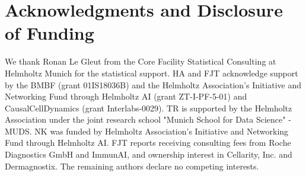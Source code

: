 \documentclass{article}
\begin{document}
\section*{Acknowledgments and Disclosure of Funding}
We thank Ronan Le Gleut from the Core Facility Statistical Consulting at Helmholtz Munich for
the statistical support. HA and FJT acknowledge support by the BMBF (grant 01IS18036B) and the
Helmholtz Association’s Initiative and Networking Fund through Helmholtz AI (grant ZT-I-PF-5-01)
and CausalCellDynamics (grant Interlabs-0029). TR is supported by the Helmholtz Association under
the joint research school "Munich School for Data Science" - MUDS. NK was funded by Helmholtz
Association’s Initiative and Networking Fund through Helmholtz AI. FJT reports receiving consulting
fees from Roche Diagnostics GmbH and ImmunAI, and ownership interest in Cellarity, Inc. and
Dermagnostix. The remaining authors declare no competing interests.

\printbibliography
\end{document}
